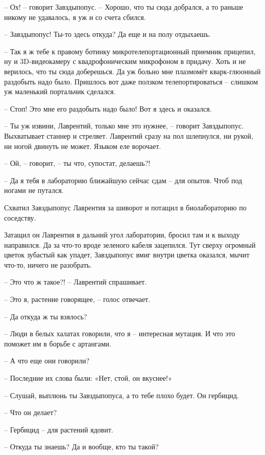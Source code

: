 \documentclass[ebook,oneside,final,openright]{memoir}
\begin{document}
– Ох! – говорит Завздыпопус. – Хорошо, что ты сюда добрался, а то раньше никому не удавалось, я уж и со счета сбился.\par
– Завздыпопус! Ты-то здесь откуда? Да еще и на полу отдыхаешь.\par
– Так я ж тебе к правому ботинку микротелепортационный приемник прицепил, ну и 3D-видеокамеру с квадрофоническим микрофоном в придачу. Хоть и не верилось, что ты сюда доберешься. Да уж больно мне плазмомёт кварк-глюонный раздобыть надо было. Пришлось вот даже ползком телепортироваться – слишком уж маленький портальчик сделался.\par
– Стоп! Это мне его раздобыть надо было! Вот я здесь и оказался.\par
– Ты уж извини, Лаврентий, только мне это нужнее, – говорит Завздыпопус. Выхватывает станнер и стреляет. Лаврентий сразу на пол шлепнулся, ни рукой, ни ногой двинуть не может. Языком еле ворочает.\par
– Ой, – говорит, – ты что, супостат, делаешь?!\par
– Да я тебя в лабораторию ближайшую сейчас сдам – для опытов. Чтоб под ногами не путался.\par
Схватил Завздыпопус Лаврентия за шиворот и потащил в биолабораторию по соседству.\par
\par
Затащил он Лаврентия в дальний угол лаборатории, бросил там и к выходу направился. Да за что-то вроде зеленого кабеля зацепился. Тут сверху огромный цветок зубастый как упадет, Завздыпопус вмиг внутри цветка оказался, мычит что-то, ничего не разобрать.\par
\par
– Это что ж такое?! – Лаврентий спрашивает.\par
– Это я, растение говорящее, – голос отвечает.\par
– Да откуда ж ты взялось?\par
– Люди в белых халатах говорили, что я – интересная мутация. И что это поможет им в борьбе с артангами.\par
– А что еще они говорили?\par
– Последние их слова были: «Нет, стой, он вкуснее!»\par
– Слушай, выплюнь ты Завздыпопуса, а то тебе плохо будет. Он гербицид.\par
– Что он делает?\par
– Гербицид – для растений ядовит.\par
– Откуда ты знаешь? Да и вообще, кто ты такой?\par
\end{document}
